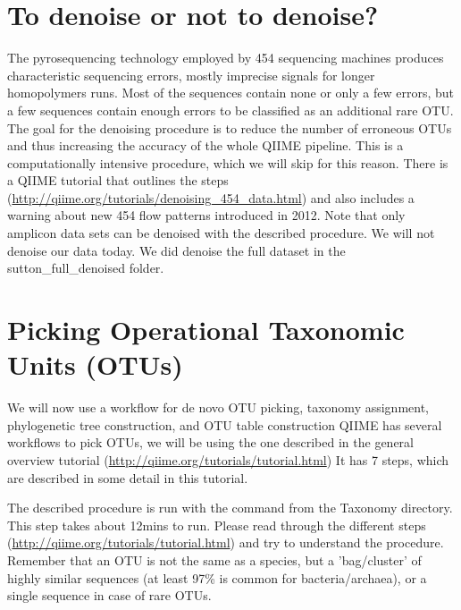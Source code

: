 \documentclass[a4paper,12pt,twoside]{memoir}
\begin{document}
\clearpage

\section{To denoise or not to denoise?}

\begin{information}
The pyrosequencing technology employed by 454 sequencing machines produces characteristic sequencing errors, mostly imprecise signals for longer homopolymers runs. Most of the sequences contain none or only a few errors, but a few sequences contain enough errors to be classified as an additional rare OTU. The goal for the denoising procedure is to reduce the number of erroneous OTUs and thus increasing the accuracy of the whole QIIME pipeline. This is a computationally intensive procedure, which we will skip for this reason. There is a QIIME tutorial that outlines the steps (\url{http://qiime.org/tutorials/denoising\_454\_data.html}) and also includes a warning about new 454 flow patterns introduced in 2012. Note that only amplicon data sets can be denoised with the described procedure. We will not denoise our data today. We did denoise the full dataset in the sutton\_full\_denoised folder.
\end{information}

\section{Picking Operational Taxonomic Units (OTUs)}

\begin{information}
We will now use a workflow for de novo OTU picking, taxonomy assignment, phylogenetic tree construction, and OTU table construction QIIME has several workflows to pick OTUs, we will be using the one described in the general overview tutorial (\url{http://qiime.org/tutorials/tutorial.html}) It has 7 steps, which are described in some detail in this tutorial. 


The described procedure is run with the command from the Taxonomy directory. This step takes about 12mins to run. Please read through the different steps (\url{http://qiime.org/tutorials/tutorial.html}) and try to understand the procedure. Remember that an OTU is not the same as a species, but a 'bag/cluster' of highly similar sequences (at least 97\% is common for bacteria/archaea), or a single sequence in case of rare OTUs.
\end{information}
\end{document}
